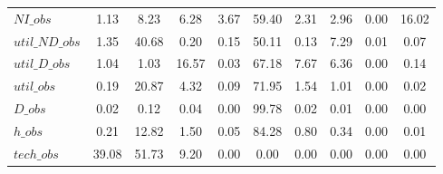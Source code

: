 \begin{center}
\begin{longtable}{lccccccccc}
$NI\_obs        $	 & 	         1.13	 & 	         8.23	 & 	         6.28	 & 	         3.67	 & 	        59.40	 & 	         2.31	 & 	         2.96	 & 	         0.00	 & 	        16.02 \\ 
$util\_ND\_obs  $	 & 	         1.35	 & 	        40.68	 & 	         0.20	 & 	         0.15	 & 	        50.11	 & 	         0.13	 & 	         7.29	 & 	         0.01	 & 	         0.07 \\ 
$util\_D\_obs   $	 & 	         1.04	 & 	         1.03	 & 	        16.57	 & 	         0.03	 & 	        67.18	 & 	         7.67	 & 	         6.36	 & 	         0.00	 & 	         0.14 \\ 
$util\_obs      $	 & 	         0.19	 & 	        20.87	 & 	         4.32	 & 	         0.09	 & 	        71.95	 & 	         1.54	 & 	         1.01	 & 	         0.00	 & 	         0.02 \\ 
$D\_obs         $	 & 	         0.02	 & 	         0.12	 & 	         0.04	 & 	         0.00	 & 	        99.78	 & 	         0.02	 & 	         0.01	 & 	         0.00	 & 	         0.00 \\ 
$h\_obs         $	 & 	         0.21	 & 	        12.82	 & 	         1.50	 & 	         0.05	 & 	        84.28	 & 	         0.80	 & 	         0.34	 & 	         0.00	 & 	         0.01 \\ 
$tech\_obs      $	 & 	        39.08	 & 	        51.73	 & 	         9.20	 & 	         0.00	 & 	         0.00	 & 	         0.00	 & 	         0.00	 & 	         0.00	 & 	         0.00 \\ 
\end{longtable}
 \end{center}
